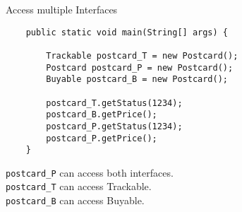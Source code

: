 \begin{frame}[fragile]{Access multiple Interfaces}
	\begin{lstlisting}
	public static void main(String[] args) {
	
	    Trackable postcard_T = new Postcard();
	    Postcard postcard_P = new Postcard();
	    Buyable postcard_B = new Postcard();

	    postcard_T.getStatus(1234);
	    postcard_B.getPrice();
	    postcard_P.getStatus(1234);
	    postcard_P.getPrice();
	}
	\end{lstlisting}
	\texttt{postcard\_P} can access both interfaces.\\
	\texttt{postcard\_T} can access Trackable.\\
	\texttt{postcard\_B} can access Buyable.
\end{frame}
